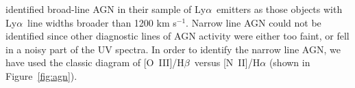 \documentclass[manuscript]{emulateapj}
\newcommand{\lya}{Ly$\alpha$}
\newcommand{\ha}{H$\alpha$}
\newcommand{\hb}{H$\beta$}
\newcommand{\oiii}{[O~{\small III}]}
\newcommand{\civ}{C~{\small IV}}
\newcommand{\ciii}{[C~{\small III]}}
\newcommand{\nii}{[N~{\small II]}}
\newcommand{\kms}{km s$^{-1}$}
\begin{document}
\citet{deharveng2008} identified broad-line AGN in their sample of
\lya\ emitters as those objects with \lya\ line widths broader than
1200 \kms. Narrow line AGN could not be identified since other
diagnostic lines of AGN activity %
were either too faint, or fell in a noisy part of the UV spectra.  In
order to identify the narrow line AGN, we have used the classic
\citet[][BPT]{baldwin1981} diagram of \oiii/\hb\ versus \nii/\ha
(shown in Figure~\ref{fig:agn}).




\end{document}
